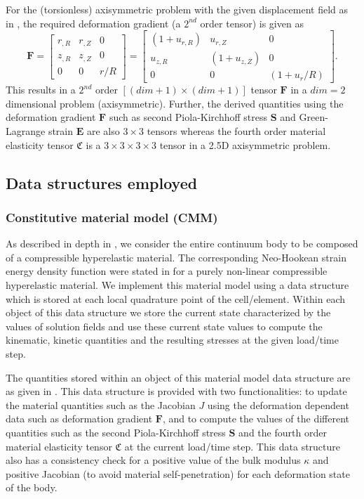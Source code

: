For the (torsionless) axisymmetric problem with the given displacement field as in , the required deformation gradient (a $2^{nd}$ order tensor) is given as \cite{Zienkiewicz2013}
\begin{equation}
\mathbf{F} = \begin{bmatrix}
r_{, R} & r_{, Z} & 0 \\
z_{, R} & z_{, Z} & 0 \\
0 & 0 & r/R
\end{bmatrix} = \begin{bmatrix}
(1 + u_{r, R}) & u_{r, Z} & 0 \\
u_{z, R} & (1 + u_{z, Z}) & 0 \\
0 & 0 & (1 + u_r / R)
\end{bmatrix}.
\label{eq:2.26}
\end{equation}
This results in a $2^{nd}$ order $[(dim + 1) \times (dim + 1)]$ tensor $\mathbf{F}$ in a $dim = 2$ dimensional problem (axisymmetric).  Further, the derived quantities using the deformation gradient $\mathbf{F}$ such as second Piola-Kirchhoff stress $\mathbf{S}$ and Green-Lagrange strain $\mathbf{E}$ are also $3 \times 3$ tensors whereas the fourth order material elasticity tensor $\mathfrak{C}$ is a $3 \times 3 \times 3 \times 3$ tensor in a 2.5D axisymmetric problem.

\subsection{Data structures employed}
\subsubsection{Constitutive material model (CMM)}
As described in depth in , we consider the entire continuum body to be composed of a compressible hyperelastic material. The corresponding Neo-Hookean strain energy density function were stated in  for a purely non-linear compressible hyperelastic material. We implement this material model using a data structure which is stored at each local quadrature point of the cell/element. Within each object of this data structure we store the current state characterized by the values of solution fields and use these current state values to compute the kinematic, kinetic quantities and the resulting stresses at the given load/time step.\par 
The quantities stored within an object of this material model data structure are as given in . This data structure is provided with two functionalities: to update the material quantities such as the Jacobian $J$ using the deformation dependent data such as deformation gradient $\mathbf{F}$, and to compute the values of the different quantities such as the second Piola-Kirchhoff stress $\mathbf{S}$ and the fourth order material elasticity tensor $\mathfrak{C}$ at the current load/time step. This data structure also has a consistency check for a positive value of the bulk modulus $\kappa$ and positive Jacobian (to avoid material self-penetration) for each deformation state of the body. \par 


